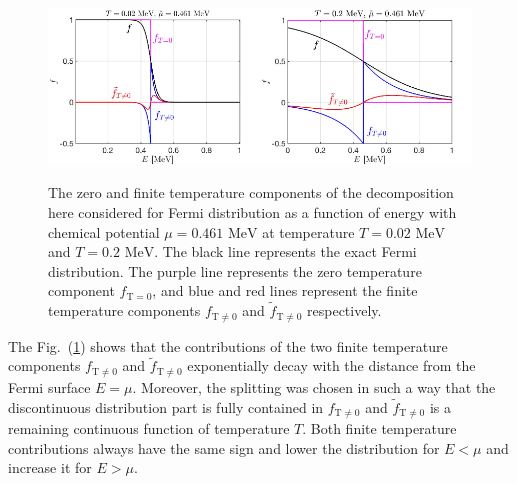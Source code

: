 \documentclass[sn-mathphys,Numbered]{sn-jnl}
\newcommand*{\MeV}{\text{ MeV}}
\newcommand{\rev}[1]{{\color{blue}#1}}
\begin{document}
\begin{figure}[ht]
\centering
\includegraphics[width=0.5\textwidth]{./plot/FermiZeorFiniteTemperature}\includegraphics[width=0.5\textwidth]{./plot/FermiZeroFiniteTemperature002}
\caption{%
The zero and finite temperature components of the decomposition here considered for Fermi distribution as a function of energy with chemical potential $\mu=0.461\MeV$ at temperature $T=0.02\MeV$ and $T=0.2\MeV$. The black line represents the exact Fermi distribution. The purple line represents the zero temperature component $f_{\mathrm{T}=0}$, and blue and red lines represent the finite temperature components $f_\mathrm{T\neq0}$ and $\widetilde f_\mathrm{T\neq0}$ respectively. }
\label{Fermi_Component}
\end{figure}

The Fig.~(\ref{Fermi_Component}) shows that \rev{the contributions of the two finite temperature components $f_\mathrm{T\neq0}$ and $\widetilde f_\mathrm{T\neq0}$ exponentially decay with the distance from the Fermi surface $E=\mu$. Moreover, the splitting was chosen in such a way that the discontinuous distribution part is fully contained in $f_\mathrm{T\neq 0}$ and $\widetilde{f}_\mathrm{T\neq 0}$ is a remaining continuous function of temperature $T$.}  Both finite temperature contributions always have the same sign \rev{and lower the distribution for $E < \mu$ and increase it for $E > \mu$}.
\end{document}
